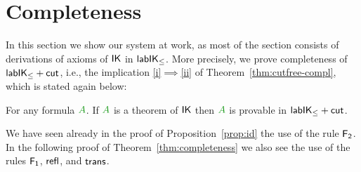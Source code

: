 
\section{Completeness}\label{sec:completeness}

In this section we show our system at work, as most of the section
consists of derivations of axioms of $\mathsf{IK}$ in $\mathsf{lab}\mathsf{IK}_{\le}$. More precisely, we prove completeness of $\mathsf{lab}\mathsf{IK}_{\le}+\mathsf{cut}$, i.e., the implication \ref{i}$\implies$\ref{ii} of Theorem~\ref{thm:cutfree-compl}, which is stated again below:

\begin{theorem}\label{thm:completeness}
	For any formula $\fm A$. If $\fm A$ is a theorem of $\mathsf{IK}$ then $\fm A$ is provable in $\mathsf{lab}\mathsf{IK}_{\le} +\mathsf{cut}_{}$.
\end{theorem}

\begin{remark}
  We have seen already in the proof of Proposition~\ref{prop:id} the
  use of the rule $\mathsf{F_2}$. In the following proof of
  Theorem~\ref{thm:completeness} we also see the use of the rules
  $\mathsf{F_1}$, $\mathsf{refl}$, and $\mathsf{trans}$.
\end{remark}



